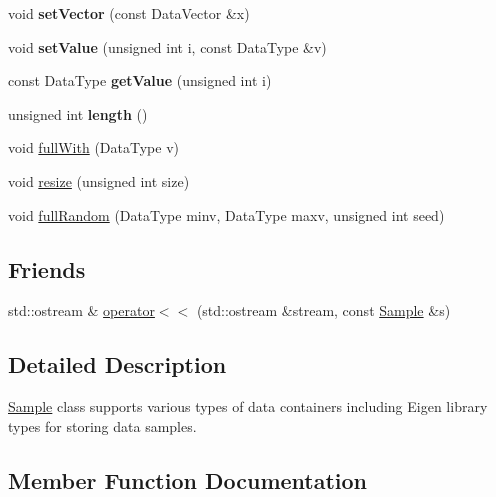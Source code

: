 \begin{DoxyCompactItemize}
\item 
\hypertarget{classtf_1_1_sample_a81d435398df6f4fadcdc65eed2d9e460}{}void {\bfseries set\+Vector} (const Data\+Vector \&x)\label{classtf_1_1_sample_a81d435398df6f4fadcdc65eed2d9e460}

\item 
\hypertarget{classtf_1_1_sample_aa61fa8f5846da22c39f1ff274a7431e3}{}void {\bfseries set\+Value} (unsigned int i, const Data\+Type \&v)\label{classtf_1_1_sample_aa61fa8f5846da22c39f1ff274a7431e3}

\item 
\hypertarget{classtf_1_1_sample_a139925470ab28d28bcdd8dc8945ca4b2}{}const Data\+Type {\bfseries get\+Value} (unsigned int i)\label{classtf_1_1_sample_a139925470ab28d28bcdd8dc8945ca4b2}

\item 
\hypertarget{classtf_1_1_sample_a2e5f1413e903ce417f4cae5ee7ff81f7}{}unsigned int {\bfseries length} ()\label{classtf_1_1_sample_a2e5f1413e903ce417f4cae5ee7ff81f7}

\item 
void \hyperlink{classtf_1_1_sample_a14a7a69c3503dca821894101bac068f5}{full\+With} (Data\+Type v)
\item 
void \hyperlink{classtf_1_1_sample_a8efb97745cf3077ab441e133135f69cb}{resize} (unsigned int size)
\item 
void \hyperlink{classtf_1_1_sample_a3b7d493f3f4e98f8049403202706f2c6}{full\+Random} (Data\+Type minv, Data\+Type maxv, unsigned int seed)
\end{DoxyCompactItemize}
\subsection*{Friends}
\begin{DoxyCompactItemize}
\item 
std\+::ostream \& \hyperlink{classtf_1_1_sample_a64b00da31562a56f33f5ba04bdad899b}{operator$<$$<$} (std\+::ostream \&stream, const \hyperlink{classtf_1_1_sample}{Sample} \&s)
\end{DoxyCompactItemize}


\subsection{Detailed Description}
\hyperlink{classtf_1_1_sample}{Sample} class supports various types of data containers including Eigen library types for storing data samples. 

\subsection{Member Function Documentation}
\hypertarget{classtf_1_1_sample_a3b7d493f3f4e98f8049403202706f2c6}{}

